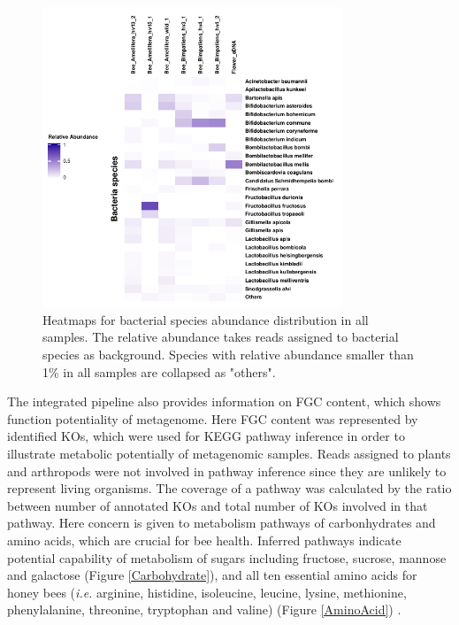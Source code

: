 \documentclass[11pt]{article}
\begin{document}
      \begin{figure}[H]
        \centering
        \includegraphics[width=0.8\textwidth]{../Figures/RelativeAbundance_0_01_species_Bacteria.pdf}
        \caption{Heatmaps for bacterial species abundance distribution in all samples. 
        The relative abundance takes reads assigned to bacterial species as background. 
        Species with relative abundance smaller than 1\% in all samples are collapsed as "others".}
        \label{BacteriaHeatmap}
        \end{figure}

    The integrated pipeline also provides information on FGC content, which shows function potentiality of metagenome. 
    Here FGC content was represented by identified KOs, which were used for KEGG pathway inference in order to illustrate metabolic potentially of metagenomic samples. 
    Reads assigned to plants and arthropods were not involved in pathway inference since they are unlikely to represent living organisms. 
    The coverage of a pathway was calculated by the ratio between number of annotated KOs and total number of KOs involved in that pathway. 
    \newline
    Here concern is given to metabolism pathways of carbonhydrates and amino acids, which are crucial for bee health. 
    Inferred pathways indicate potential capability of metabolism of sugars including fructose, sucrose, mannose and galactose (Figure \ref{Carbohydrate}), and all ten essential amino acids for honey bees (\textit{i.e.} arginine, histidine, isoleucine, leucine, lysine, methionine, phenylalanine, threonine, tryptophan and valine) (Figure \ref{AminoAcid}) \citep{groot1953protein}. 
\end{document}
